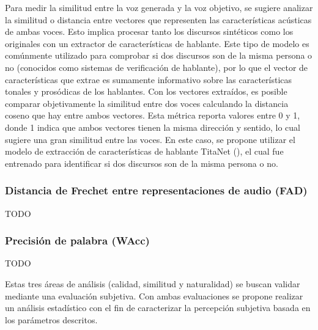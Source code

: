 Para medir la similitud entre la voz generada y la voz objetivo, se sugiere analizar la similitud o distancia entre vectores que representen las características acústicas de ambas voces. Esto implica procesar tanto los discursos sintéticos como los originales con un extractor de características de hablante. Este tipo de modelo es comúnmente utilizado para comprobar si dos discursos son de la misma persona o no (conocidos como sistemas de verificación de hablante), por lo que el vector de características que extrae es sumamente informativo sobre las características tonales y prosódicas de los hablantes. Con los vectores extraídos, es posible comparar objetivamente la similitud entre dos voces calculando la distancia coseno que hay entre ambos vectores. Esta métrica reporta valores entre 0 y 1, donde 1 indica que ambos vectores tienen la misma dirección y sentido, lo cual sugiere una gran similitud entre las voces. En este caso, se propone utilizar el modelo de extracción de características de hablante TitaNet (\cite{koluguri2022}), el cual fue entrenado para identificar si dos discursos son de la misma persona o no.

\subsubsection{Distancia de Frechet entre representaciones de audio (FAD)}
TODO

\subsubsection{Precisión de palabra (WAcc)}
TODO

Estas tres áreas de análisis (calidad, similitud y naturalidad) se buscan validar mediante una evaluación subjetiva. Con ambas evaluaciones se propone realizar un análisis estadístico con el fin de caracterizar la percepción subjetiva basada en los parámetros descritos.

